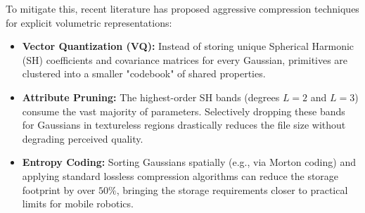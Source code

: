 To mitigate this, recent literature has proposed aggressive compression techniques for explicit volumetric representations:
\begin{itemize}
    \item \textbf{Vector Quantization (VQ):} Instead of storing unique Spherical Harmonic (SH) coefficients and covariance matrices for every Gaussian, primitives are clustered into a smaller "codebook" of shared properties.
    \item \textbf{Attribute Pruning:} The highest-order SH bands (degrees $L=2$ and $L=3$) consume the vast majority of parameters. Selectively dropping these bands for Gaussians in textureless regions drastically reduces the file size without degrading perceived quality.
    \item \textbf{Entropy Coding:} Sorting Gaussians spatially (e.g., via Morton coding) and applying standard lossless compression algorithms can reduce the storage footprint by over $50\%$, bringing the storage requirements closer to practical limits for mobile robotics.
\end{itemize}